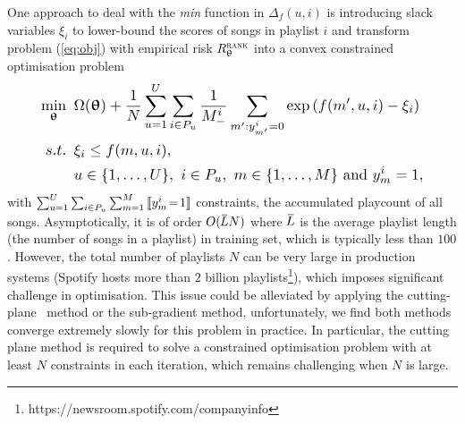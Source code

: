 One approach to deal with the \emph{min} function in $\Delta_f(u, i)$ is introducing 
slack variables $\xi_i$ to lower-bound the scores of songs in playlist $i$ %
and 
transform problem (\ref{eq:obj}) with empirical risk $R_{\uptheta}^{\textsc{rank}}$ into a convex constrained optimisation problem %
\begin{equation}
\label{eq:expobj_cons}
\resizebox{.888\linewidth}{!}{$\displaystyle
\begin{aligned}
\min_{\upthetabm} \ \, & 
\Omega(\upthetabm) + \frac{1}{N} \sum_{u=1}^U \sum_{i \in P_u} \frac{1}{M_-^i} \sum_{m': y_{m'}^i = 0} \exp \left( f(m', u, i) - \xi_i \right) \\
s.t. \ \, & 
\xi_i \le f(m, u, i), \\
& u \in \{1,\dots,U\}, \ i \in P_u, \ m \in \{1,\dots,M\} \ \text{and} \ y_m^i = 1,
\end{aligned}
$}
\end{equation}
%
with
$
\sum_{u=1}^U \sum_{i \in P_u} \sum_{m=1}^M \, \llbracket y_m^i \!= \!1 \rrbracket
$
constraints,
\ie the accumulated playcount of all songs.
Asymptotically, it is of order {\small $O(\widebar{L} N)$} where {\small $\widebar{L}$} 
is the average playlist length (\ie the number of songs in a playlist) in training set,
which is typically less than $100$.
However,
the total number of playlists {\small $N$} can be very large in production systems 
(\eg Spotify hosts more than $2$ billion playlists\footnote{https://newsroom.spotify.com/companyinfo}),
which imposes significant challenge in optimisation. 
%
This issue could be alleviated by applying the cutting-plane~\cite{avriel2003nonlinear} method or the sub-gradient method,
unfortunately, we find both methods converge extremely slowly for this problem in practice.
In particular, the cutting plane method is required to solve 
a constrained optimisation problem with at least {\small $N$} constraints in each iteration, 
which remains challenging when {\small $N$} is large.


